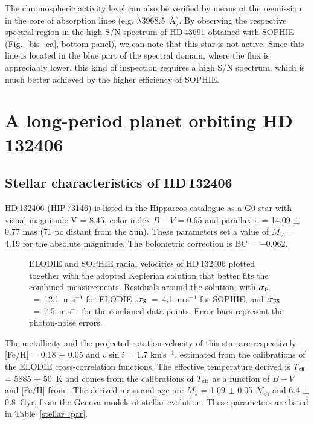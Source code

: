 \documentclass{aa}
\begin{document}
The chromospheric activity level can also be verified by means of the
reemission in the core of  absorption lines (e.g.
$\lambda$3968.5~\AA). By observing the respective spectral region in the
high S/N spectrum of HD\,43691 obtained with SOPHIE (Fig.~\ref{bis_ca},
bottom panel), we can note that this star is not active. Since this line is
located in the blue part of the spectral domain, where the flux is
appreciably lower, this kind of inspection requires a high S/N spectrum,
which is much better achieved by the higher efficiency of SOPHIE.

\section{A long-period planet orbiting HD\,132406}
\label{star_par2}
\subsection{Stellar characteristics of HD\,132406}
\label{star_car2}
HD\,132406 (HIP\,73146) is listed in the Hipparcos catalogue as a G0 star
with visual magnitude V = 8.45, color index $B-V$ = 0.65 and parallax $\pi$
= 14.09 $\pm$ 0.77 mas (71 pc distant from the Sun). These parameters set a
value of $M_V$ = 4.19 for the absolute magnitude. The bolometric correction
is BC = $-$0.062.

\begin{figure}[t!]
  \centering
\caption{\top ELODIE and SOPHIE radial velocities of HD\,132406 plotted
           together with the adopted Keplerian solution that better fits the
	   combined measurements.
	   \bot Residuals around the solution, with
	   $\sigma_{\rm E}$~=~12.1~m\,s$^{-1}$ for ELODIE,
	   $\sigma_{\rm S}$~=~4.1~m\,s$^{-1}$ for SOPHIE, and
	   $\sigma_{\rm ES}$~=~7.5~m\,s$^{-1}$ for the combined data points.
	   Error bars represent the photon-noise errors.}
  \label{rv_2}
\end{figure}


The metallicity and the projected rotation velocity of this star are
respectively [Fe/H] = 0.18 $\pm$ 0.05 and $v{\sin i}$ = 1.7 km\,s$^{-1}$,
estimated from the calibrations of the ELODIE cross-correlation functions.
The effective temperature derived is $T_{\rm eff}$ = 5885 $\pm$ 50~K and
comes from the calibrations of $T_{\rm eff}$ as a function of $B-V$ and
[Fe/H] from \citet{Santosetal2004}. The derived mass and age are $M_\star$ =
1.09 $\pm$ 0.05~M$_{\odot}$ and 6.4 $\pm$ 0.8~Gyr, from the Geneva models of
stellar evolution. These parameters are listed in Table~\ref{stellar_par}.
\end{document}
